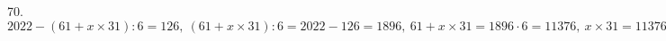 70. $2022-(61+x\times31):6=126,\ (61+x\times31):6=2022-126=1896,\ 61+x\times31=1896\cdot6=11376,\ x\times31=11376-61=11315,\ x=11315:31=365.$\\
